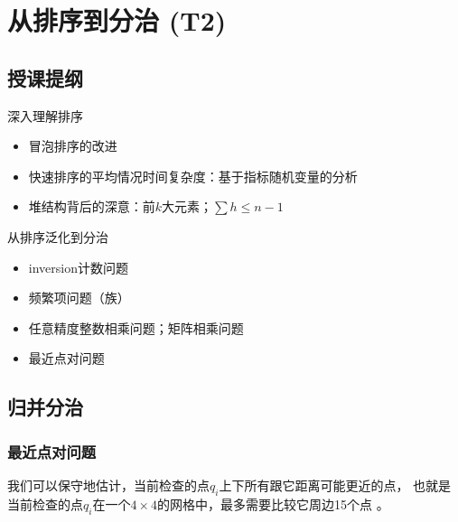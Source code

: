 \chapter{从排序到分治 (T2)} \label{chap:tut-divide-conquer}

\section*{授课提纲}



\nid 深入理解排序
\begin{itemize}
    \item 冒泡排序的改进
    \item 快速排序的平均情况时间复杂度：基于指标随机变量的分析
    \item 堆结构背后的深意：前$k$大元素；$\sum h \leq n-1$
\end{itemize}


\nid 从排序泛化到分治
\begin{itemize}
    \item inversion计数问题
    \item 频繁项问题（族）
    \item 任意精度整数相乘问题；矩阵相乘问题
    \item 最近点对问题
\end{itemize}



\section{归并分治}

\subsection{最近点对问题} \label{subsec:closest-pair}

我们可以保守地估计，当前检查的点$q_i$上下所有跟它距离可能更近的点，
也就是当前检查的点$q_i$在一个$4\times 4$的网格中，最多需要比较它周边15个点 \cite[\S 5.4]{Kleinberg06}。

